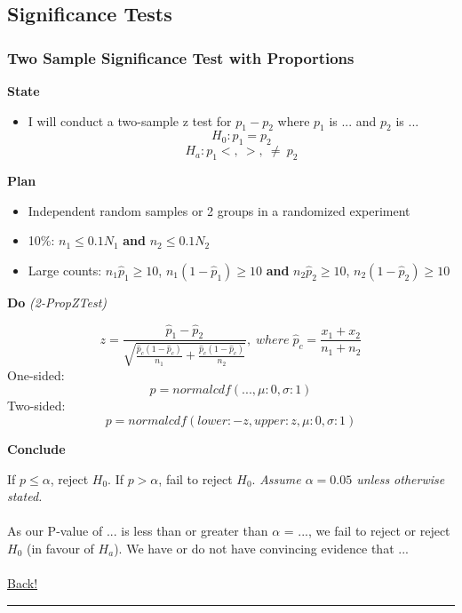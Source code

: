 \documentclass[main]{subfiles}
\begin{document}
\subsection{Significance Tests}


\subsubsection{Two Sample Significance Test with Proportions}
\textbf{State}
\begin{itemize}
    \item I will conduct a two-sample z test for $p_1 - p_2$ where $p_1$ is ... and $p_2$ is ...
    \[H_0 : p_1 = p_2\]
    \[H_a : p_1 <,\:>,\:\neq\ p_2\]
\end{itemize}
\textbf{Plan}
\begin{itemize}
    \item Independent random samples or 2 groups in a randomized experiment
    \item 10\%: $n_1 \leq 0.1N_1$ \textbf{and} $n_2 \leq 0.1N_2$
    \item Large counts: $n_1\hat{p}_1 \geq 10$, $n_1(1-\hat{p}_1) \geq 10$ \textbf{and} $n_2\hat{p}_2 \geq 10$, $n_2(1-\hat{p}_2) \geq 10$
\end{itemize}
\textbf{Do} \textit{(2-PropZTest)}

\[z = \frac{\hat{p}_1 - \hat{p}_2}{\sqrt{\frac{\hat{p}_c(1 - \hat{p}_c)}{n_1} + \frac{\hat{p}_c(1 - \hat{p}_c)}{n_2}}},\;where\; \hat{p}_c = \frac{x_1 + x_2}{n_1 + n_2}\]
One-sided: \[p = normalcdf(..., \mu: 0, \sigma: 1)\]
Two-sided: \[p = normalcdf(lower: -z, upper: z, \mu: 0, \sigma: 1)\]

\noindent\textbf{Conclude}

If $p \leq \alpha$, reject $H_0$. If $p > \alpha$, fail to reject $H_0$.
\textit{Assume $\alpha = 0.05$ unless otherwise stated.}
\\~\\
As our P-value of ... is less than or greater than $\alpha$ = ..., we fail to reject or reject $H_0$ (in favour of $H_a$). 
We have or do not have convincing evidence that ...
\\~\\
\hyperlink{toc}{Back!}
\newline\hrule

\end{document}
